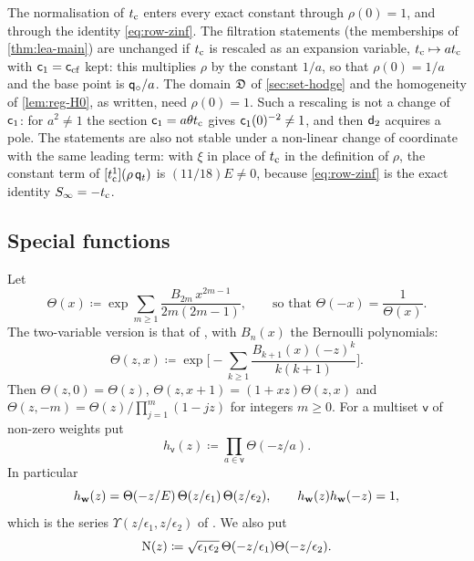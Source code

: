 \begin{rmk}[Normalisation of $\tc$]
\label{rmk:set-norm}
The normalisation of $\tc$ enters every exact constant through $\rho(0)=1$, and through the identity \eqref{eq:row-zinf}. The filtration statements (the memberships of \cref{thm:lea-main}) are unchanged if $\tc$ is rescaled as an expansion variable, $t_{\mathrm{c}}\mapsto at_{\mathrm{c}}$ with $\mathsf{c}_{1}=\mathsf{c}_{\mathrm{cf}}$ kept: this multiplies $\rho$ by the constant $1/a$, so that $\rho(0)=1/a$ and the base point is $\mathsf{q}_{\circ}/a$. The domain $\mathfrak{D}$ of \cref{sec:set-hodge} and the homogeneity of \cref{lem:reg-H0}, as written, need $\rho(0)=1$. Such a rescaling is not a change of $\mathsf{c}_{1}$: for $a^2\neq1$ the section $\mathsf{c}_{1}=a\theta t_{\mathrm{c}}$ gives $\mathsf{c}_{1}(0)^{-2}\neq1$, and then $\mathsf{d}_{2}$ acquires a pole. The statements are also not stable under a non-linear change of coordinate with the same leading term: with $\xi$ in place of $\tc$ in the definition of $\rho$, the constant term of $[t_{\mathrm{c}}^1](\rho\,\mathsf{q}_{t})$ is $(11/18)E\neq0$, because \eqref{eq:row-zinf} is the exact identity $S_{\infty}=-t_{\mathrm{c}}$.
\end{rmk}

\subsection{Special functions}
\label{sec:set-special}

Let
\[
\Theta(x)\coloneqq\exp\sum_{m\geq1}\frac{B_{2m}\,x^{2m-1}}{2m(2m-1)},\qquad\text{so that }\Theta(-x)=\frac{1}{\Theta(x)}.
\]
The two-variable version is that of \cite{BS}, with $B_n(x)$ the Bernoulli polynomials:
\[
\Theta(z,x)\coloneqq\exp\Big[-\sum_{k\geq1}\frac{B_{k+1}(x)(-z)^k}{k(k+1)}\Big].
\]
Then $\Theta(z,0)=\Theta(z)$, $\Theta(z,x+1)=(1+xz)\Theta(z,x)$ and $\Theta(z,-m)=\Theta(z)/\prod_{j=1}^{m}(1-jz)$ for integers $m\geq0$. For a multiset $\mathsf{v}$ of non-zero weights put
\[
h_{\mathsf{v}}(z)\coloneqq\prod_{a\in\mathsf{v}}\Theta(-z/a).
\]
In particular
\begin{equation}
\label{eq:set-hw}
h_{\mathbf{w}}(z)=\Theta(-z/E)\,\Theta(z/\epsilon_1)\,\Theta(z/\epsilon_2),\qquad h_{\mathbf{w}}(z)h_{\mathbf{w}}(-z)=1,
\end{equation}
which is the series $\Upsilon(z/\epsilon_1,z/\epsilon_2)$ of \cite{BS}. We also put
\[
\mathrm{N}(z)\coloneqq\sqrt{\epsilon_1\epsilon_2}\,\Theta(-z/\epsilon_1)\Theta(-z/\epsilon_2).
\]

